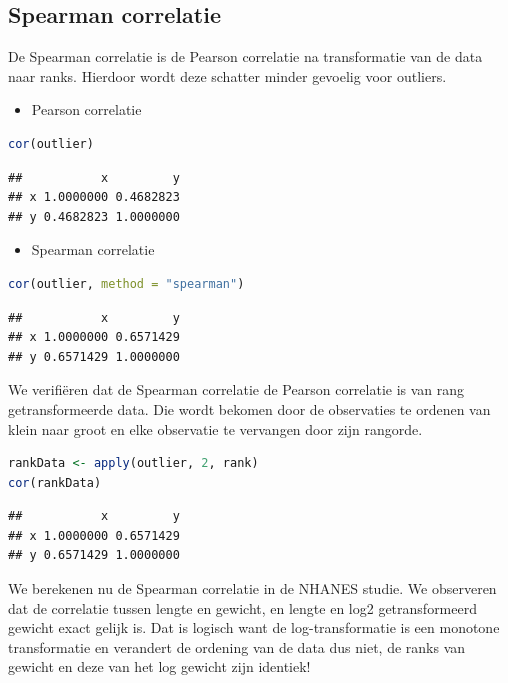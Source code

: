 \documentclass[
  12pt,dutch,coursenotes]{book}
\providecommand{\tightlist}{%
  \setlength{\itemsep}{0pt}\setlength{\parskip}{0pt}}
\begin{document}
\hypertarget{spearman-correlatie}{%
\subsection{Spearman correlatie}\label{spearman-correlatie}}

De Spearman correlatie is de Pearson correlatie na transformatie van de data naar ranks. Hierdoor wordt deze schatter minder gevoelig voor outliers.

\begin{itemize}
\tightlist
\item
  Pearson correlatie
\end{itemize}

\begin{lstlisting}[language=R]
cor(outlier)
\end{lstlisting}

\begin{lstlisting}
##           x         y
## x 1.0000000 0.4682823
## y 0.4682823 1.0000000
\end{lstlisting}

\begin{itemize}
\tightlist
\item
  Spearman correlatie
\end{itemize}

\begin{lstlisting}[language=R]
cor(outlier, method = "spearman")
\end{lstlisting}

\begin{lstlisting}
##           x         y
## x 1.0000000 0.6571429
## y 0.6571429 1.0000000
\end{lstlisting}

We verifiëren dat de Spearman correlatie de Pearson correlatie is van rang getransformeerde data. Die wordt bekomen door de observaties te ordenen van klein naar groot en elke observatie te vervangen door zijn rangorde.

\begin{lstlisting}[language=R]
rankData <- apply(outlier, 2, rank)
cor(rankData)
\end{lstlisting}

\begin{lstlisting}
##           x         y
## x 1.0000000 0.6571429
## y 0.6571429 1.0000000
\end{lstlisting}

We berekenen nu de Spearman correlatie in de NHANES studie.
We observeren dat de correlatie tussen lengte en gewicht, en lengte en log2 getransformeerd gewicht exact gelijk is.
Dat is logisch want de log-transformatie is een monotone transformatie en verandert de ordening van de data dus niet, de ranks van gewicht en deze van het log gewicht zijn identiek!
\end{document}
